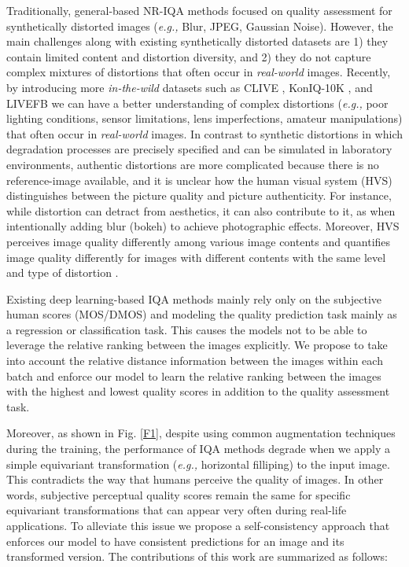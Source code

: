 \documentclass[10pt,twocolumn,letterpaper]{article}
\begin{document}
Traditionally, general-based NR-IQA methods focused on quality assessment for synthetically distorted images (\textit{e.g.,} Blur, JPEG, Gaussian Noise). 
However, the main challenges along with existing synthetically distorted datasets are 1) they contain limited content and distortion diversity, and 2) they do not capture complex mixtures of distortions that often occur in \textit{real-world} images. 
Recently, by introducing more \textit{in-the-wild} datasets such as
CLIVE \cite{ghadiyaram2015massive},  KonIQ-10K \cite{hosu2020koniq}, and LIVEFB \cite{ying2019patches} we can have a better understanding of complex  distortions (\textit{e.g.,} poor lighting conditions,
sensor limitations, lens imperfections, amateur manipulations) that often occur in
\textit{real-world} images. 
In contrast to  synthetic distortions in which   
degradation processes are precisely specified and can be simulated in laboratory environments, authentic  distortions are more complicated because there is no reference-image  
available, and it is unclear how the human visual system  (HVS) distinguishes between the picture quality and picture authenticity.
For instance, while distortion can detract from
aesthetics, it can also contribute to it, as when intentionally
adding blur (bokeh) to achieve photographic effects.
Moreover, HVS perceives image quality differently among various image contents and quantifies image quality differently  for images with different contents with the same level and type  of distortion  \cite{chou1995perceptually,wang2009mean,alam2014local,li2018has}.

Existing deep learning-based IQA methods mainly rely only on the subjective human scores (MOS/DMOS) and modeling the quality prediction task mainly as a regression or classification task.
This causes the models not   to be able to  leverage the relative ranking between the images explicitly.
We propose to take into account the relative distance information between the images within each batch and enforce our model to learn the relative ranking between the images with the highest and lowest quality scores in addition to the quality assessment task.


Moreover, as shown in Fig. \ref{F1}, 
 despite using common augmentation techniques during the training, the performance of IQA methods degrade
when we apply a simple equivariant transformation  (\textit{e.g.,} horizontal filliping) to the input image.
This contradicts the way that humans perceive the quality of images. 
In other words, subjective perceptual quality scores remain the same for specific equivariant transformations that can appear very often during real-life applications.
To alleviate this issue we propose a self-consistency approach that enforces our model to have consistent predictions for an image and its transformed version.
The contributions of this work are summarized as follows:
\end{document}
